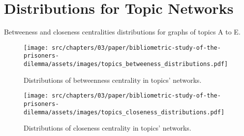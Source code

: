 \section{Distributions for Topic Networks}\label{appendix:distributions}

Betweeness and closeness centralities distributions for graphs of topics A to E.

\begin{figure}[!hbtp]
    \centering
    \texttt{[image: src/chapters/03/paper/bibliometric-study-of-the-prisoners-dilemma/assets/images/topics\_betweeness\_distributions.pdf]}
    \caption{Distributions of betweenness centrality in topics' networks.}
    \label{fig:bc_distributions_topics}
\end{figure}

\begin{figure}[!hbtp]
    \centering
    \texttt{[image: src/chapters/03/paper/bibliometric-study-of-the-prisoners-dilemma/assets/images/topics\_closeness\_distributions.pdf]}
    \caption{Distributions of closeness centrality in topics' networks.}
    \label{fig:cc_distributions_topics}
\end{figure}